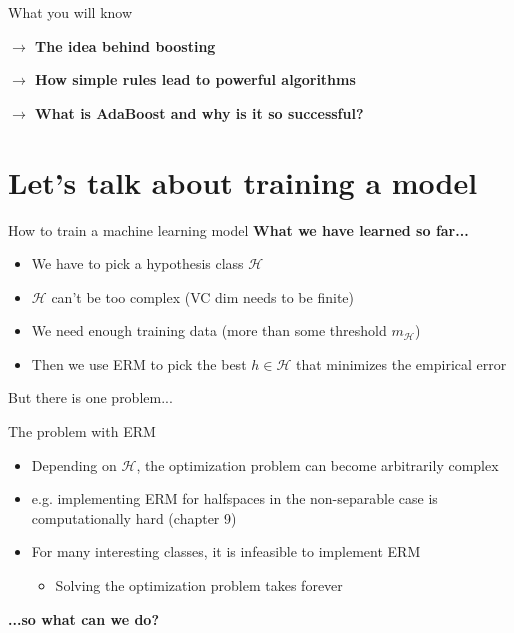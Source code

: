 \begin{frame}{What you will know} \pause

    \textbf{$\rightarrow$ The idea behind boosting}
    
    \vspace{0.8cm}
    
    \pause

    \textbf{$\rightarrow$ How simple rules lead to powerful algorithms}

    \vspace{0.8cm}
    
    \pause

    \textbf{$\rightarrow$ What is AdaBoost and why is it so successful?}
\end{frame}

\section{Let's talk about training a model}

\begin{frame}{How to train a machine learning model}
    \textbf{What we have learned so far...} \pause
    \begin{itemize}
        \item We have to pick a hypothesis class $\mathcal{H}$ \pause
        \item $\mathcal{H}$ can't be too complex (VC dim needs to be finite) \pause
        \item We need enough training data (more than some threshold $m_\mathcal{H}$) \pause
        \item Then we use ERM to pick the best $h \in \mathcal{H}$ that minimizes the empirical error \pause
    \end{itemize}
    But there is one problem...
\end{frame}

\begin{frame}{The problem with ERM}
\setlength{\fboxrule}{2pt}
    \begin{center}
    \end{center}

    \pause    
    
    \begin{itemize}
        \item Depending on $\mathcal{H}$, the optimization problem can become arbitrarily complex \pause
        \item e.g. implementing ERM for halfspaces in the non-separable case is computationally hard (chapter 9) \pause
        \item For many interesting classes, it is infeasible to implement ERM
        \begin{itemize}
            \item Solving the optimization problem takes forever
        \end{itemize}
    \end{itemize}

    \pause    
    
    \textbf{...so what can we do?}
\end{frame}


